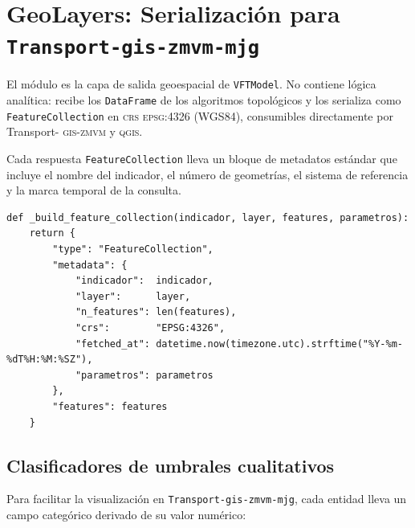 
\section{GeoLayers: Serialización para \texorpdfstring{\texttt{Transport-gis-zmvm-mjg}}{Transport-gis-zmvm-mjg}}
\label{anx:vft-geolayers}

El módulo  es la capa de salida geoespacial
de \texttt{VFTModel}. No contiene lógica analítica: recibe los \texttt{DataFrame} de los
algoritmos topológicos y los serializa como \texttt{FeatureCollection} en
\textsc{crs} \textsc{epsg:4326} (WGS84), consumibles directamente por Transport-
\textsc{gis}-\textsc{zmvm} y \textsc{qgis}.

Cada respuesta \texttt{FeatureCollection} lleva un bloque de metadatos estándar
que incluye el nombre del indicador, el número de geometrías, el sistema de
referencia y la marca temporal de la consulta.

\begin{lstlisting}[style=estiloPython,
    caption={Envoltura estándar VFT para toda respuesta GeoJSON.
             \texttt{src/api/routes/geo\_layers.py}.},
    label=lst:vft-feature-collection]
def _build_feature_collection(indicador, layer, features, parametros):
    return {
        "type": "FeatureCollection",
        "metadata": {
            "indicador":  indicador,
            "layer":      layer,
            "n_features": len(features),
            "crs":        "EPSG:4326",
            "fetched_at": datetime.now(timezone.utc).strftime("%Y-%m-%dT%H:%M:%SZ"),
            "parametros": parametros
        },
        "features": features
    }
\end{lstlisting}

\subsection*{Clasificadores de umbrales cualitativos}

Para facilitar la visualización en \texttt{Transport-gis-zmvm-mjg}, cada entidad lleva un
campo categórico derivado de su valor numérico:

